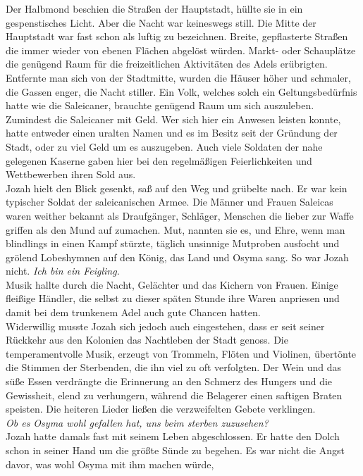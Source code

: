 Der Halbmond beschien die Straßen der Hauptstadt, hüllte sie in ein gespenstisches Licht. Aber die 
Nacht war keineswegs still. Die Mitte der Hauptstadt war fast schon als luftig zu bezeichnen. 
Breite, gepflasterte Straßen die immer wieder von ebenen Flächen abgelöst würden. Markt- oder 
Schauplätze die genügend Raum für die freizeitlichen Aktivitäten des Adels erübrigten. Entfernte 
man 
sich von der Stadtmitte, wurden die Häuser höher und schmaler, die Gassen enger, die Nacht stiller. 
Ein Volk, welches solch ein Geltungsbedürfnis hatte wie die Saleicaner, brauchte genügend Raum um 
sich auszuleben. Zumindest die Saleicaner mit Geld. Wer sich hier ein Anwesen leisten konnte, hatte 
entweder einen uralten Namen und es im Besitz seit der Gründung der Stadt, oder zu viel Geld um es 
auszugeben. Auch viele Soldaten der nahe gelegenen Kaserne gaben hier bei den regelmäßigen 
Feierlichkeiten und 
Wettbewerben ihren Sold aus.\\
Jozah hielt den Blick gesenkt, saß auf den Weg und grübelte nach. Er war kein typischer Soldat 
der saleicanischen Armee. Die Männer und Frauen Saleicas waren weither bekannt als Draufgänger, 
Schläger, Menschen die lieber zur Waffe griffen als den Mund auf zumachen. Mut, nannten sie es, und 
Ehre, wenn man blindlings in einen Kampf stürzte, täglich unsinnige Mutproben ausfocht und grölend 
Lobeshymnen auf den König, das Land und Osyma sang. So war Jozah nicht. \textit{Ich bin ein 
Feigling.}\\
Musik hallte durch die Nacht, Gelächter und das Kichern von Frauen. Einige fleißige Händler, die 
selbst zu dieser späten Stunde ihre Waren anpriesen und damit bei dem trunkenem Adel auch gute 
Chancen hatten.\\
Widerwillig musste Jozah sich jedoch auch eingestehen, dass er seit seiner Rückkehr aus den 
Kolonien das Nachtleben der Stadt genoss. Die temperamentvolle Musik, erzeugt von Trommeln, Flöten 
und Violinen, übertönte die Stimmen der Sterbenden, die ihn viel zu oft verfolgten. Der Wein und 
das süße Essen verdrängte die Erinnerung an den Schmerz des Hungers und die Gewissheit, elend zu 
verhungern, während die Belagerer einen saftigen Braten speisten. Die heiteren Lieder ließen die 
verzweifelten Gebete verklingen.\\
\textit{Ob es Osyma wohl gefallen hat, uns beim sterben zuzusehen?}\\
Jozah hatte damals fast mit seinem Leben abgeschlossen. Er hatte den Dolch schon in seiner Hand um 
die größte Sünde zu begehen. Es war nicht die Angst davor, was wohl Osyma mit ihm machen würde, 

